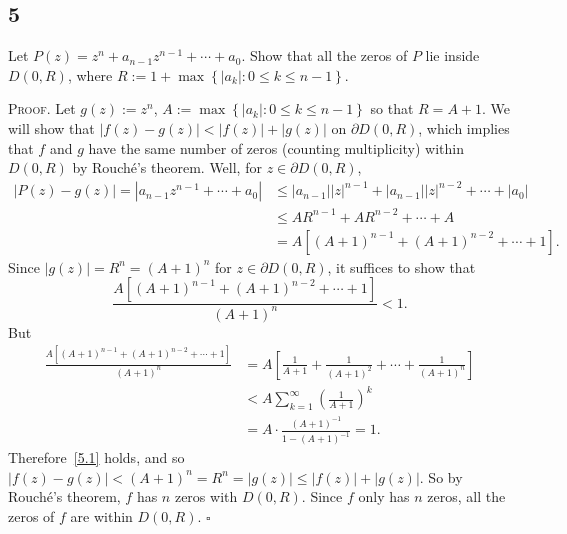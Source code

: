 \documentclass[12pt]{article}
\newcounter{ProofCounter}
\newenvironment{Proof}{\stepcounter{ProofCounter}\textsc{Proof.}}{\hfill$\square$}
\begin{document}
\subsection*{5}
\begin{tcolorbox}
  Let $P(z) = z^n + a_{n-1}z^{n-1} + \cdots + a_0$. Show that all the zeros of $P$ lie inside $D(0,R)$, where $R := 1 + \max\left\{
  |a_k| : 0 \leq k \leq n-1\right\}$.
\end{tcolorbox}
\begin{Proof}
  Let $g(z) := z^{n}$, $A := \max\left\{ |a_k| : 0\leq k \leq n-1 \right\}$ so that $R = A + 1$. We will show that $|f(z) - g(z)| < |f(z)| + |g(z)|$ on
  $\partial D(0,R)$, which implies that $f$ and $g$ have the same number of zeros (counting multiplicity) within $D(0,R)$ by Rouch\'{e}'s theorem.
  Well, for $z \in \partial D(0,R)$,
  \begin{align*}
    |P(z) - g(z)| = |a_{n-1}z^{n-1} + \cdots + a_0| & \leq |a_{n-1}||z|^{n-1} + |a_{n-1}||z|^{n-2} + \cdots + |a_{0}| \\
    & \leq AR^{n-1} + AR^{n-2} + \cdots + A \\
    & = A[(A+1)^{n-1} + (A + 1)^{n-2} + \cdots + 1].
  \end{align*}
  Since $|g(z)| = R^{n} = (A + 1)^{n}$ for $z\in \partial D(0,R)$, it suffices to show that
  \begin{equation}
    \frac{A[(A+1)^{n-1} + (A + 1)^{n-2} + \cdots + 1]}{(A + 1)^{n}} < 1.
    \label{5.1}
  \end{equation}
  But
  \begin{align*}
    \frac{A[(A+1)^{n-1} + (A + 1)^{n-2} + \cdots + 1]}{(A + 1)^{n}} & = A\left[ \frac{1}{A+1} + \frac{1}{(A+1)^{2}} + \cdots + \frac{1}{(A+1)^{n}}
    \right] \\
    & < A\sum_{k=1}^{\infty}\left( \frac{1}{A + 1} \right)^{k} \\
    & = A\cdot \frac{(A + 1)^{-1}}{1 - (A+1)^{-1}} = 1.
  \end{align*}
  Therefore~\eqref{5.1} holds, and so $|f(z) - g(z)| < (A + 1)^{n} = R^{n} = |g(z)| \leq |f(z)| + |g(z)|$. So by Rouch\'{e}'s theorem, $f$ has $n$
  zeros with $D(0,R)$. Since $f$ only has $n$ zeros, all the zeros of $f$ are within $D(0,R)$.
\end{Proof}


\newpage
\end{document}
